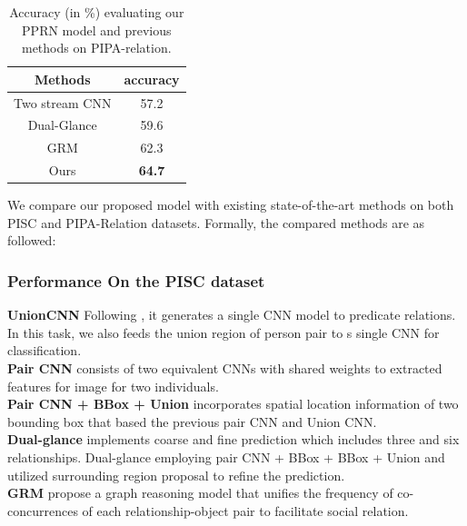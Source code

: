 \documentclass{article}
\newcommand{\PPRN}{{\sf PPRN}}
\begin{document}
\begin{table}[htpb]
  \centering
  \caption{Accuracy (in \%) evaluating our {\PPRN} model and previous methods on PIPA-relation.}
  \label{tab:pipa_table}
  \begin{tabular}{c|c}
    \hline
    Methods & accuracy \\
    \hline\hline
    Two stream CNN \cite{DBLP:conf/cvpr/ZhangPTFB15} & 57.2 \\
    Dual-Glance \cite{DBLP:conf/iccv/LiWZK17} & 59.6 \\
    GRM \cite{DBLP:conf/ijcai/WangCRYCL18} & 62.3 \\
    \hline
    Ours & \textbf{64.7}\\
    \hline
  \end{tabular}
\end{table}

We compare our proposed model with existing state-of-the-art methods on both PISC and PIPA-Relation datasets. Formally, the compared methods are as followed:

\subsubsection{Performance On the PISC dataset}

{\bf UnionCNN}  Following \cite{DBLP:conf/eccv/LuKBL16}, it generates a single CNN model to predicate relations. In this task, we also feeds the union region of person pair to s single CNN for classification.\\
{\bf Pair CNN}\cite{DBLP:conf/iccv/LiWZK17} consists of two equivalent CNNs with shared weights to extracted features for image for two individuals.\\
{\bf Pair CNN + BBox + Union}\cite{DBLP:conf/iccv/LiWZK17} incorporates spatial location information of two bounding box that based the previous pair CNN and Union CNN.\\
{\bf Dual-glance}\cite{DBLP:conf/iccv/LiWZK17} implements coarse and fine prediction which includes three and six relationships. Dual-glance employing pair CNN + BBox + BBox + Union and utilized surrounding region proposal to refine the prediction.\\
{\bf GRM}\cite{DBLP:conf/ijcai/WangCRYCL18} propose a graph reasoning model that unifies the frequency of co-concurrences of each relationship-object pair to facilitate social relation.
\end{document}
